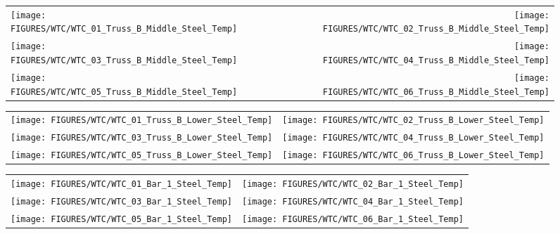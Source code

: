 \begin{figure}[p]
\begin{tabular*}{\textwidth}{l@{\extracolsep{\fill}}r}
\texttt{[image: FIGURES/WTC/WTC\_01\_Truss\_B\_Middle\_Steel\_Temp]} &
\texttt{[image: FIGURES/WTC/WTC\_02\_Truss\_B\_Middle\_Steel\_Temp]} \\
\texttt{[image: FIGURES/WTC/WTC\_03\_Truss\_B\_Middle\_Steel\_Temp]} &
\texttt{[image: FIGURES/WTC/WTC\_04\_Truss\_B\_Middle\_Steel\_Temp]} \\
\texttt{[image: FIGURES/WTC/WTC\_05\_Truss\_B\_Middle\_Steel\_Temp]} &
\texttt{[image: FIGURES/WTC/WTC\_06\_Truss\_B\_Middle\_Steel\_Temp]}
\end{tabular*}
\label{NIST_WTC_Truss_B_Middle_Steel_Temp}
\end{figure}

\begin{figure}[p]
\begin{tabular*}{\textwidth}{l@{\extracolsep{\fill}}r}
\texttt{[image: FIGURES/WTC/WTC\_01\_Truss\_B\_Lower\_Steel\_Temp]} &
\texttt{[image: FIGURES/WTC/WTC\_02\_Truss\_B\_Lower\_Steel\_Temp]} \\
\texttt{[image: FIGURES/WTC/WTC\_03\_Truss\_B\_Lower\_Steel\_Temp]} &
\texttt{[image: FIGURES/WTC/WTC\_04\_Truss\_B\_Lower\_Steel\_Temp]} \\
\texttt{[image: FIGURES/WTC/WTC\_05\_Truss\_B\_Lower\_Steel\_Temp]} &
\texttt{[image: FIGURES/WTC/WTC\_06\_Truss\_B\_Lower\_Steel\_Temp]}
\end{tabular*}
\label{NIST_WTC_Truss_B_Lower_Steel_Temp}
\end{figure}


\begin{figure}[p]
\begin{tabular*}{\textwidth}{l@{\extracolsep{\fill}}r}
\texttt{[image: FIGURES/WTC/WTC\_01\_Bar\_1\_Steel\_Temp]} &
\texttt{[image: FIGURES/WTC/WTC\_02\_Bar\_1\_Steel\_Temp]} \\
\texttt{[image: FIGURES/WTC/WTC\_03\_Bar\_1\_Steel\_Temp]} &
\texttt{[image: FIGURES/WTC/WTC\_04\_Bar\_1\_Steel\_Temp]} \\
\texttt{[image: FIGURES/WTC/WTC\_05\_Bar\_1\_Steel\_Temp]} &
\texttt{[image: FIGURES/WTC/WTC\_06\_Bar\_1\_Steel\_Temp]}
\end{tabular*}
\label{NIST_WTC_Bar_1_Steel_Temp}
\end{figure}


